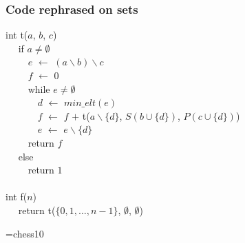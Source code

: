 \documentclass[handout,compress]{beamer}
\newcommand{\kw}[1]{{\color{blue}#1}}
\newcommand{\minelt}[1]{\ensuremath{\mathit{min\_elt}(#1)}}
\begin{document}
\begin{frame}
  \frametitle{Code rephrased on sets}
{\tt\begin{obeylines}
  int t($a$, $b$, $c$) \\
  ~~ \kw{if} $a \not= \emptyset$ \\
  ~~~~ $e$ $\leftarrow$ $(a \backslash  b) \backslash c$ \\
  ~~~~ $f$ $\leftarrow$ 0 \\
  ~~~~ \kw{while} $e \not=\emptyset$ \\
  ~~~~~~ $d$ $\leftarrow$ $\minelt{e}$ \\
  ~~~~~~ $f$ $\leftarrow$ $f$ $+$ t($a\backslash \{d\}$, $S(b\cup\{d\})$, $P(c\cup\{d\})$) \\
  ~~~~~~ $e$ $\leftarrow$ $e \backslash  \{d\}$ \\
  ~~~~ \kw{return} $f$ \\
  ~~ \kw{else} \\
  ~~~~ \kw{return} $1$ \\
  ~~ \\
  int f($n$) \\
  ~~ \kw{return} t($\{0,1,\dots,n-1\}$, $\emptyset$, $\emptyset$)
\end{obeylines}}
\end{frame}

\font\Chess=chess10
\newcommand{\qw}{\vrule height 1.5em width 0pt{\Chess Q}}
\newcommand{\qb}{\vrule height 1.5em width 0pt{\Chess q}}
\newcommand{\qr}{\vrule height 1.5em width 0pt{\color{red}\Chess q}}
\newcommand{\vide}{\vrule height 1.5em width 0pt\phantom{\Chess q}}
\newcommand{\qm}{\vrule height 1.5em width 0pt\hfil?\hfil}
\end{document}
